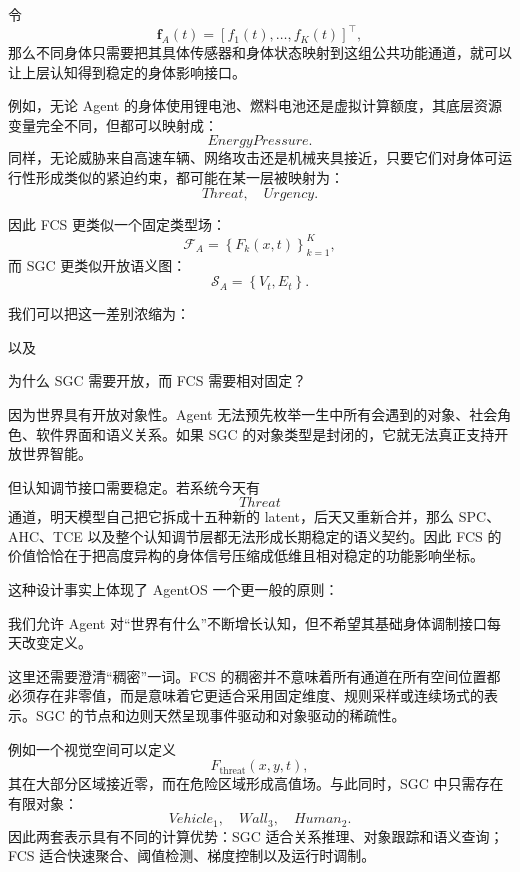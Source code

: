 令
\[
\mathbf f_A(t)
=
[
f_1(t),\ldots,f_K(t)]^\top,
\]
那么不同身体只需要把其具体传感器和身体状态映射到这组公共功能通道，就可以让上层认知得到稳定的身体影响接口。

例如，无论 Agent 的身体使用锂电池、燃料电池还是虚拟计算额度，其底层资源变量完全不同，但都可以映射成：
\[
EnergyPressure.
\]
同样，无论威胁来自高速车辆、网络攻击还是机械夹具接近，只要它们对身体可运行性形成类似的紧迫约束，都可能在某一层被映射为：
\[
Threat,
\quad
Urgency.
\]

因此 FCS 更类似一个固定类型场：
\[
\mathcal F_A
=
\left\{
F_k(x,t)
\right\}_{k=1}^{K},
\]
而 SGC 更类似开放语义图：
\[
\mathcal S_A
=
\left\{
V_t,E_t
\right\}.
\]

我们可以把这一差别浓缩为：
\begin{statementbox}
\centering
{}
\end{statementbox}
以及
\begin{statementbox}
\centering
{}
\end{statementbox}

为什么 SGC 需要开放，而 FCS 需要相对固定？

因为世界具有开放对象性。Agent 无法预先枚举一生中所有会遇到的对象、社会角色、软件界面和语义关系。如果 SGC 的对象类型是封闭的，它就无法真正支持开放世界智能。

但认知调节接口需要稳定。若系统今天有
\[
Threat
\]
通道，明天模型自己把它拆成十五种新的 latent，后天又重新合并，那么 SPC、AHC、TCE 以及整个认知调节层都无法形成长期稳定的语义契约。因此 FCS 的价值恰恰在于把高度异构的身体信号压缩成低维且相对稳定的功能影响坐标。

这种设计事实上体现了 AgentOS 一个更一般的原则：
\begin{statementbox}
\centering
{}
\end{statementbox}

我们允许 Agent 对“世界有什么”不断增长认知，但不希望其基础身体调制接口每天改变定义。

这里还需要澄清“稠密”一词。FCS 的稠密并不意味着所有通道在所有空间位置都必须存在非零值，而是意味着它更适合采用固定维度、规则采样或连续场式的表示。SGC 的节点和边则天然呈现事件驱动和对象驱动的稀疏性。

例如一个视觉空间可以定义
\[
F_{\mathrm{threat}}(x,y,t),
\]
其在大部分区域接近零，而在危险区域形成高值场。与此同时，SGC 中只需存在有限对象：
\[
Vehicle_1,\quad Wall_3,\quad Human_2.
\]
因此两套表示具有不同的计算优势：SGC 适合关系推理、对象跟踪和语义查询；FCS 适合快速聚合、阈值检测、梯度控制以及运行时调制。

